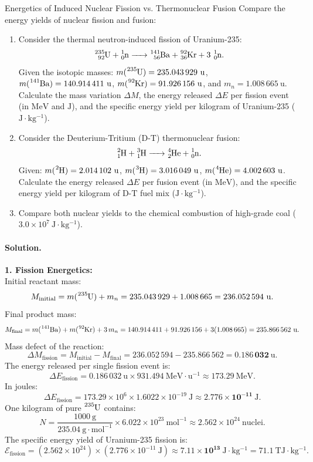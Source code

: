 \begin{workedexample}{Energetics of Induced Nuclear Fission vs. Thermonuclear Fusion}
Compare the energy yields of nuclear fission and fusion:
\begin{enumerate}[leftmargin=1.4em,itemsep=3pt]
  \item Consider the thermal neutron-induced fission of Uranium-235:
  \[
  \ce{^{235}_{92}U + ^1_0n -> ^{141}_{56}Ba + ^{92}_{36}Kr + 3\,^1_0n}.
  \]
  Given the isotopic masses:
  $m(\ce{^{235}U}) = 235.043\,929\ \mathrm{u}$, $m(\ce{^{141}Ba}) = 140.914\,411\ \mathrm{u}$, $m(\ce{^{92}Kr}) = 91.926\,156\ \mathrm{u}$, and $m_n = 1.008\,665\ \mathrm{u}$.
  Calculate the mass variation $\Delta M$, the energy released $\Delta E$ per fission event (in $\mathrm{MeV}$ and $\mathrm{J}$), and the specific energy yield per kilogram of Uranium-235 ($\mathrm{J\cdot kg^{-1}}$).
  \item Consider the Deuterium-Tritium ($\mathrm{D}$-$\mathrm{T}$) thermonuclear fusion:
  \[
  \ce{^2_1H + ^3_1H -> ^4_2He + ^1_0n}.
  \]
  Given: $m(\ce{^2H}) = 2.014\,102\ \mathrm{u}$, $m(\ce{^3H}) = 3.016\,049\ \mathrm{u}$, $m(\ce{^4He}) = 4.002\,603\ \mathrm{u}$.
  Calculate the energy released $\Delta E$ per fusion event (in $\mathrm{MeV}$), and the specific energy yield per kilogram of $\mathrm{D}$-$\mathrm{T}$ fuel mix ($\mathrm{J\cdot kg^{-1}}$).
  \item Compare both nuclear yields to the chemical combustion of high-grade coal ($3.0 \times 10^7\ \mathrm{J\cdot kg^{-1}}$).
\end{enumerate}

\paragraph{Solution.}
\textbf{1. Fission Energetics:}\\
Initial reactant mass:
\[
M_{\text{initial}} = m(\ce{^{235}U}) + m_n = 235.043\,929 + 1.008\,665 = 236.052\,594\ \mathrm{u}.
\]
Final product mass:
\[
M_{\text{final}} = m(\ce{^{141}Ba}) + m(\ce{^{92}Kr}) + 3\,m_n = 140.914\,411 + 91.926\,156 + 3(1.008\,665) = 235.866\,562\ \mathrm{u}.
\]
Mass defect of the reaction:
\[
\Delta M_{\text{fission}} = M_{\text{initial}} - M_{\text{final}} = 236.052\,594 - 235.866\,562 = \mathbf{0.186\,032\ \mathrm{u}}.
\]
The energy released per single fission event is:
\[
\Delta E_{\text{fission}} = 0.186\,032\ \mathrm{u} \times 931.494\ \mathrm{MeV\cdot u^{-1}} \approx \mathbf{173.29\ \mathrm{MeV}}.
\]
In joules:
\[
\Delta E_{\text{fission}} = 173.29 \times 10^6 \times 1.6022 \times 10^{-19}\ \mathrm{J} \approx \mathbf{2.776 \times 10^{-11}\ \mathrm{J}}.
\]
One kilogram of pure $\ce{^{235}U}$ contains:
\[
N = \frac{1000\ \mathrm{g}}{235.04\ \mathrm{g\cdot mol^{-1}}} \times 6.022 \times 10^{23}\ \mathrm{mol^{-1}} \approx 2.562 \times 10^{24}\ \text{nuclei}.
\]
The specific energy yield of Uranium-235 fission is:
\[
\mathcal{E}_{\text{fission}} = (2.562 \times 10^{24}) \times (2.776 \times 10^{-11}\ \mathrm{J}) \approx \mathbf{7.11 \times 10^{13}\ \mathrm{J\cdot kg^{-1}} = 71.1\ \mathrm{TJ\cdot kg^{-1}}}.
\]


\end{workedexample}
